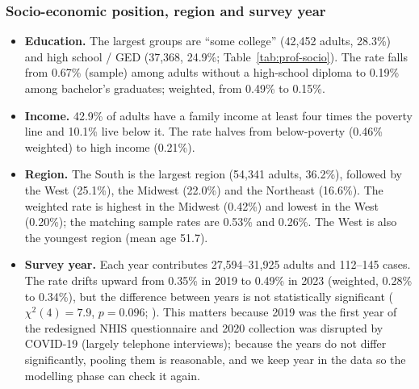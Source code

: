 \begin{table}[htbp]
\centering\footnotesize
\caption{Inside each sex and race/ethnicity group: age, sex, smoking and COPD, which explain much of the difference in lung-cancer rates (percentages among adults with a known answer; rate weighted). Source: \texttt{group\_profile.csv}.}\label{tab:group-profile}

\end{table}

\subsubsection{Socio-economic position, region and survey year}\label{sec:socio}

\begin{table}[htbp]
\centering\footnotesize
\caption{Socio-economic, geographic and yearly profile (same columns as Table~\ref{tab:prof-demo}). Income is family income divided by the poverty line.}\label{tab:prof-socio}

\end{table}

\begin{itemize}
  \item \textbf{Education.} The largest groups are ``some college'' (42,452 adults, 28.3\%) and high school / GED (37,368, 24.9\%; Table~\ref{tab:prof-socio}). The rate falls from 0.67\% (sample) among adults without a high-school diploma to 0.19\% among bachelor's graduates; weighted, from 0.49\% to 0.15\%.
  \item \textbf{Income.} 42.9\% of adults have a family income at least four times the poverty line and 10.1\% live below it. The rate halves from below-poverty (0.46\% weighted) to high income (0.21\%).
  \item \textbf{Region.} The South is the largest region (54,341 adults, 36.2\%), followed by the West (25.1\%), the Midwest (22.0\%) and the Northeast (16.6\%). The weighted rate is highest in the Midwest (0.42\%) and lowest in the West (0.20\%); the matching sample rates are 0.53\% and 0.26\%. The West is also the youngest region (mean age 51.7).
  \item \textbf{Survey year.} Each year contributes 27,594--31,925 adults and 112--145 cases. The rate drifts upward from 0.35\% in 2019 to 0.49\% in 2023 (weighted, 0.28\% to 0.34\%), but the difference between years is not statistically significant ($\chi^2(4) = 7.9$, $p = 0.096$; ). This matters because 2019 was the first year of the redesigned NHIS questionnaire and 2020 collection was disrupted by COVID-19 (largely telephone interviews); because the years do not differ significantly, pooling them is reasonable, and we keep year in the data so the modelling phase can check it again.
\end{itemize}


